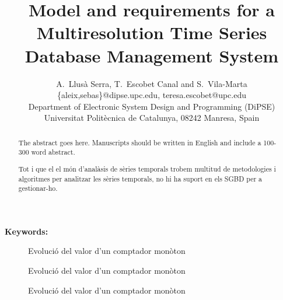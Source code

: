 \documentclass{scrartcl}
\title{
  Model and requirements for a Multiresolution Time Series
  Database Management System }
\author
{
  {
    A.\ Llusà Serra,
    T.\ Escobet Canal
    and S.\ Vila-Marta
  }\\
  {\{aleix,sebas\}@dipse.upc.edu, teresa.escobet@upc.edu}\\
  {Department of Electronic System Design and Programming (DiPSE)}\\
  {Universitat Politècnica de Catalunya, 08242 Manresa, Spain}
}
\newcommand{\experiment}{../../../src/experiments/trunk}
\begin{document}
\maketitle


\begin{abstract}
The abstract goes here.
Manuscripts should be written in English and include a 100-300 word abstract.

Tot i que el el món d'analàsis de sèries temporals trobem multitud de metodologies i algoritmes per analitzar les sèries temporals, no hi ha suport en els SGBD per a gestionar-ho.
\end{abstract}

{\bfseries Keywords:} 















\printbibliography{}



\begin{figure}[tbp]
  \centering
  \caption{Evolució del valor d'un comptador monòton}
  \label{fig:velocitats:counter}
\end{figure}



\begin{figure}[tbp]
  \centering
  
  \caption{Evolució del valor d'un comptador monòton}
  \label{fig:velocitats:counter}
\end{figure}


\begin{figure}[tbp]
  \centering
  
  \caption{Evolució del valor d'un comptador monòton}
  \label{fig:velocitats:counter}
\end{figure}
\end{document}
